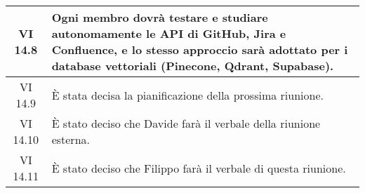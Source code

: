 \begin{table}[htbp]
\begin{tabular}{|c|p{}|}
        \hline
        VI 14.8 & Ogni membro dovrà testare e studiare autonomamente le API di GitHub, Jira e Confluence, e lo stesso approccio sarà adottato per i database vettoriali (Pinecone, Qdrant, Supabase).\\
        \hline
        VI 14.9 & È stata decisa la pianificazione della prossima riunione.\\
        \hline
        VI 14.10 & È stato deciso che Davide farà il verbale della riunione esterna.\\
        \hline
        VI 14.11 & È stato deciso che Filippo farà il verbale di questa riunione.\\
        \hline
    \end{tabular}
\end{table}